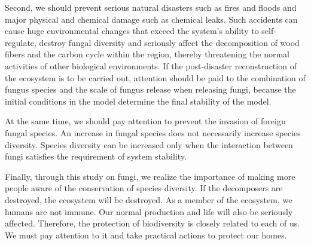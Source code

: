 {Second, we should prevent serious natural disasters such as fires and floods and major physical and chemical damage such as chemical leaks. Such accidents can cause huge environmental changes that exceed the system's ability to self-regulate, destroy fungal diversity and seriously affect the decomposition of wood fibers and the carbon cycle within the region, thereby threatening the normal activities of other biological environments. If the post-disaster reconstruction of the ecosystem is to be carried out, attention should be paid to the combination of fungus species and the scale of fungus release when releasing fungi, because the initial conditions in the model determine the final stability of the model.

At the same time, we should pay attention to prevent the invasion of foreign fungal species. An increase in fungal species does not necessarily increase species diversity. Species diversity can be increased only when the interaction between fungi satisfies the requirement of system stability.

Finally, through this study on fungi, we realize the importance of making more people aware of the conservation of species diversity. If the decomposers are destroyed, the ecosystem will be destroyed. As a member of the ecosystem, we humans are not immune. Our normal production and life will also be seriously affected. Therefore, the protection of biodiversity is closely related to each of us. We must pay attention to it and take practical actions to protect our homes.

}
